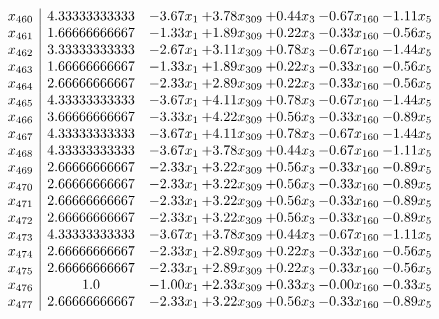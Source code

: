\documentclass[8pt]{article}
\begin{document}
\[\begin{array}{c| c c@{\hskip 2pt} c@{\hskip 2pt} c@{\hskip 2pt} c@{\hskip 2pt} c@{\hskip 2pt} }
 x_{460}   &  4.33333333333 & -3.67 x_{1} & +  3.78 x_{309} & +  0.44 x_{3} & -0.67 x_{160} & -1.11 x_{5}\\
 x_{461}   &  1.66666666667 & -1.33 x_{1} & +  1.89 x_{309} & +  0.22 x_{3} & -0.33 x_{160} & -0.56 x_{5}\\
 x_{462}   &  3.33333333333 & -2.67 x_{1} & +  3.11 x_{309} & +  0.78 x_{3} & -0.67 x_{160} & -1.44 x_{5}\\
 x_{463}   &  1.66666666667 & -1.33 x_{1} & +  1.89 x_{309} & +  0.22 x_{3} & -0.33 x_{160} & -0.56 x_{5}\\
 x_{464}   &  2.66666666667 & -2.33 x_{1} & +  2.89 x_{309} & +  0.22 x_{3} & -0.33 x_{160} & -0.56 x_{5}\\
 x_{465}   &  4.33333333333 & -3.67 x_{1} & +  4.11 x_{309} & +  0.78 x_{3} & -0.67 x_{160} & -1.44 x_{5}\\
 x_{466}   &  3.66666666667 & -3.33 x_{1} & +  4.22 x_{309} & +  0.56 x_{3} & -0.33 x_{160} & -0.89 x_{5}\\
 x_{467}   &  4.33333333333 & -3.67 x_{1} & +  4.11 x_{309} & +  0.78 x_{3} & -0.67 x_{160} & -1.44 x_{5}\\
 x_{468}   &  4.33333333333 & -3.67 x_{1} & +  3.78 x_{309} & +  0.44 x_{3} & -0.67 x_{160} & -1.11 x_{5}\\
 x_{469}   &  2.66666666667 & -2.33 x_{1} & +  3.22 x_{309} & +  0.56 x_{3} & -0.33 x_{160} & -0.89 x_{5}\\
 x_{470}   &  2.66666666667 & -2.33 x_{1} & +  3.22 x_{309} & +  0.56 x_{3} & -0.33 x_{160} & -0.89 x_{5}\\
 x_{471}   &  2.66666666667 & -2.33 x_{1} & +  3.22 x_{309} & +  0.56 x_{3} & -0.33 x_{160} & -0.89 x_{5}\\
 x_{472}   &  2.66666666667 & -2.33 x_{1} & +  3.22 x_{309} & +  0.56 x_{3} & -0.33 x_{160} & -0.89 x_{5}\\
 x_{473}   &  4.33333333333 & -3.67 x_{1} & +  3.78 x_{309} & +  0.44 x_{3} & -0.67 x_{160} & -1.11 x_{5}\\
 x_{474}   &  2.66666666667 & -2.33 x_{1} & +  2.89 x_{309} & +  0.22 x_{3} & -0.33 x_{160} & -0.56 x_{5}\\
 x_{475}   &  2.66666666667 & -2.33 x_{1} & +  2.89 x_{309} & +  0.22 x_{3} & -0.33 x_{160} & -0.56 x_{5}\\
 x_{476}   &  1.0 & -1.00 x_{1} & +  2.33 x_{309} & +  0.33 x_{3} & -0.00 x_{160} & -0.33 x_{5}\\
 x_{477}   &  2.66666666667 & -2.33 x_{1} & +  3.22 x_{309} & +  0.56 x_{3} & -0.33 x_{160} & -0.89 x_{5}\\

\end{array}\]
\end{document}
